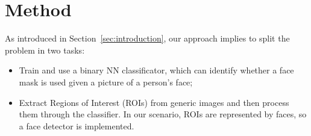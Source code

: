 \documentclass[10pt,twocolumn,letterpaper]{article}
\begin{document}



\section{Method}
\label{sec:methods}
As introduced in Section~\ref{sec:introduction}, our approach implies to split the problem in two tasks:
\begin{itemize}
    \item Train and use a binary NN classificator, which can identify whether a face mask is used given a picture of a person's face;
    \item Extract Regions of Interest (ROIs) from generic images and then process them through the classifier. In our scenario, ROIs are represented by faces, so a face detector is implemented. 
\end{itemize}
\end{document}
